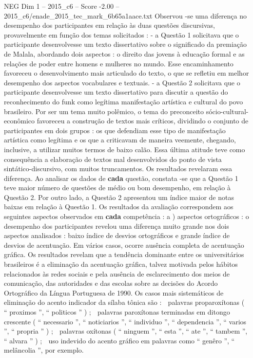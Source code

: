 \begin{textsample}{NEG Dim 1 – 2015\_c6 – Score -2.00 – 2015\_c6/enade\_2015\_tec\_mark\_6b65a1aace.txt}
Observou -se uma diferença no desempenho dos participantes em relação às duas questões discursivas, provavelmente em função dos temas solicitados : - a Questão 1 solicitava que o participante desenvolvesse um texto dissertativo sobre o significado da premiação de Malala, abordando dois aspectos : o direito das jovens à educação formal e as relações de poder entre homens e mulheres no mundo.
Esse encaminhamento favoreceu o desenvolvimento mais articulado do texto, o que se refletiu em melhor desempenho dos aspectos vocabulares e textuais. - a Questão 2 solicitava que o participante desenvolvesse um texto dissertativo para discutir a questão do reconhecimento do funk como legítima manifestação artística e cultural do povo brasileiro.
Por ser um tema muito polêmico, o tema do preconceito sócio-cultural-econômico favoreceu a construção de textos mais críticos, dividindo o conjunto de participantes em dois grupos : os que defendiam esse tipo de manifestação artística como legítima e os que a criticavam de maneira veemente, chegando, inclusive, a utilizar muitos termos de baixo calão.
Essa última atitude teve como consequência a elaboração de textos mal desenvolvidos do ponto de vista sintático-discursivo, com muitos truncamentos.
Os resultados revelaram essa diferença.
Ao analisar os dados de \textbf{cada} questão, constata -se que a Questão 1 teve maior número de questões de médio ou bom desempenho, em relação à Questão 2.
Por outro lado, a Questão 2 apresentou um índice maior de notas baixas em relação à Questão 1.
Os resultados da avaliação correspondem aos seguintes aspectos observados em \textbf{cada} competência : a ) aspectos ortográficos : o desempenho dos participantes revelou uma diferença muito grande nos dois aspectos analisados : baixo índice de desvios ortográficos e grande índice de desvios de acentuação.
Em vários casos, ocorre ausência completa de acentuação gráfica.
Os resultados revelam que a tendência dominante entre os universitários brasileiros é a eliminação da acentuação gráfica, talvez motivada pelos hábitos relacionados às redes sociais e pela ausência de esclarecimento dos meios de comunicação, das autoridades e das escolas sobre as decisões do Acordo Ortográfico da Língua Portuguesa de 1990.
Os casos mais sistemáticos de eliminação do acento indicador da sílaba tônica são :  palavras proparoxítonas ( “ proximos ”, “ politicos ” ) ;  palavras paroxítonas terminadas em ditongo crescente ( “ necessario ”, “ noticiarios ”, “ individuo ”, “ dependencia ”, “ varios ”, “ propria ” ) ;  palavras oxítonas ( “ ninguem ”, “ esta ”, “ ate ”, “ tambem ”, “ alvara ” ) ;  uso indevido do acento gráfico em palavras como “ genêro ”, “ melâncolia ”, por exemplo.

\end{textsample}
